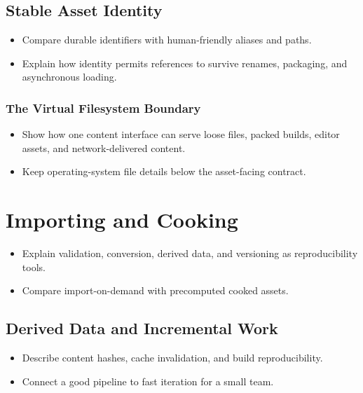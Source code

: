 \documentclass[
  11pt,
  letterpaper,
  DIV=11,
  numbers=noendperiod,
  twoside,
  open=right]{scrreprt}
\providecommand{\tightlist}{%
  \setlength{\itemsep}{0pt}\setlength{\parskip}{0pt}}
\begin{document}
\subsection{Stable Asset Identity}\label{stable-asset-identity}

\begin{itemize}
\tightlist
\item
  Compare durable identifiers with human-friendly aliases and paths.
\item
  Explain how identity permits references to survive renames, packaging,
  and asynchronous loading.
\end{itemize}

\subsubsection{The Virtual Filesystem
Boundary}\label{the-virtual-filesystem-boundary}

\begin{itemize}
\tightlist
\item
  Show how one content interface can serve loose files, packed builds,
  editor assets, and network-delivered content.
\item
  Keep operating-system file details below the asset-facing contract.
\end{itemize}

\section{Importing and Cooking}\label{importing-and-cooking}

\begin{itemize}
\tightlist
\item
  Explain validation, conversion, derived data, and versioning as
  reproducibility tools.
\item
  Compare import-on-demand with precomputed cooked assets.
\end{itemize}

\subsection{Derived Data and Incremental
Work}\label{derived-data-and-incremental-work}

\begin{itemize}
\tightlist
\item
  Describe content hashes, cache invalidation, and build
  reproducibility.
\item
  Connect a good pipeline to fast iteration for a small team.
\end{itemize}
\end{document}
